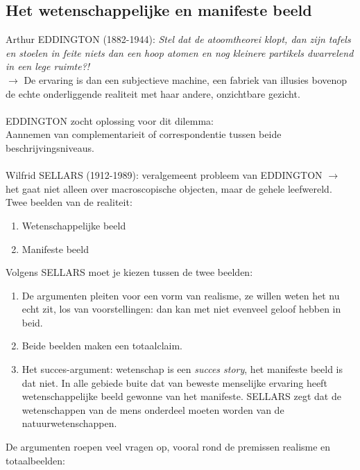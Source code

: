 \documentclass[11pt,a4paper]{article}
\begin{document}
\subsection{Het wetenschappelijke en manifeste beeld}
Arthur EDDINGTON (1882-1944): \textit{Stel dat de atoomtheorei klopt, dan zijn tafels en stoelen in feite niets dan een hoop atomen en nog kleinere partikels dwarrelend in een lege ruimte?!}
\\
$\rightarrow$ De ervaring is dan een subjectieve machine, een fabriek van illusies bovenop de echte onderliggende realiteit met haar andere, onzichtbare gezicht.
\\
\\
EDDINGTON zocht oplossing voor dit dilemma:
\\
Aannemen van complementarieit of correspondentie tussen beide beschrijvingsniveaus.
\\
\\
Wilfrid SELLARS (1912-1989): veralgemeent probleem van EDDINGTON $\rightarrow$ het gaat niet alleen over macroscopische objecten, maar de gehele leefwereld.
\\
Twee beelden van de realiteit:
\begin{enumerate}
\item Wetenschappelijke beeld
\item Manifeste beeld
\end{enumerate}
Volgens SELLARS moet je kiezen tussen de twee beelden:
\begin{enumerate}
\item De argumenten pleiten voor een vorm van realisme, ze willen weten het nu echt zit, los van voorstellingen: dan kan met niet evenveel geloof hebben in beid.
\item Beide beelden maken een totaalclaim.
\item Het succes-argument: wetenschap is een \textit{succes story}, het manifeste beeld is dat niet. In alle gebiede buite dat van beweste menselijke ervaring heeft wetenschappelijke beeld gewonne van het manifeste. SELLARS zegt dat de wetenschappen van de mens onderdeel moeten worden van de natuurwetenschappen.
\end{enumerate}
De argumenten roepen veel vragen op, vooral rond de premissen realisme en totaalbeelden:
\end{document}

